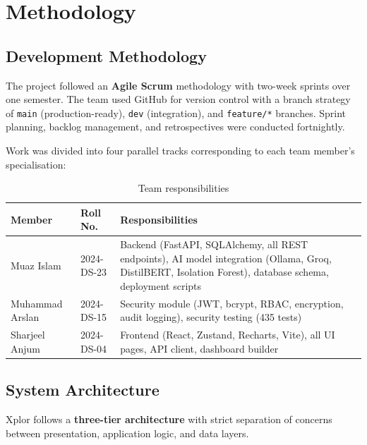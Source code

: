 \documentclass[12pt,a4paper]{report}
\begin{document}
\chapter{Methodology}

\section{Development Methodology}

The project followed an \textbf{Agile Scrum} methodology with two-week sprints over one semester. The team used GitHub for version control with a branch strategy of \texttt{main} (production-ready), \texttt{dev} (integration), and \texttt{feature/*} branches. Sprint planning, backlog management, and retrospectives were conducted fortnightly.

Work was divided into four parallel tracks corresponding to each team member's specialisation:

\begin{table}[H]
\centering
\caption{Team responsibilities}
\begin{tabularx}{\textwidth}{llX}
\toprule
\textbf{Member} & \textbf{Roll No.} & \textbf{Responsibilities} \\
\midrule
Muaz Islam      & 2024-DS-23 & Backend (FastAPI, SQLAlchemy, all REST endpoints), AI model integration (Ollama, Groq, DistilBERT, Isolation Forest), database schema, deployment scripts \\
Muhammad Arslan & 2024-DS-15 & Security module (JWT, bcrypt, RBAC, encryption, audit logging), security testing (435 tests) \\
Sharjeel Anjum  & 2024-DS-04 & Frontend (React, Zustand, Recharts, Vite), all UI pages, API client, dashboard builder \\
\bottomrule
\end{tabularx}
\end{table}

\section{System Architecture}

Xplor follows a \textbf{three-tier architecture} with strict separation of concerns between presentation, application logic, and data layers.
\end{document}
